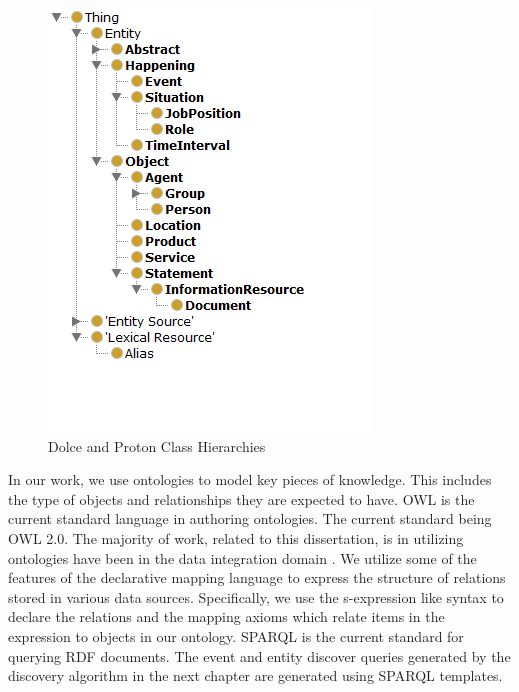 \begin{figure}[ht]
\begin{minipage}[b]{0.45\linewidth}
\includegraphics[width=\textwidth]{media/chapter3/proton-taxonomy}
\end{minipage}
\caption{Dolce and Proton Class Hierarchies}
\label{fig:ontology-hierarchies}
\end{figure}

In our work, we use ontologies to model key pieces of knowledge. This includes the type of objects and relationships they are expected to have. OWL is the current standard language in authoring ontologies. The current standard being OWL 2.0. The majority of work, related to this dissertation, is in utilizing ontologies have been in the data integration domain \cite{smith2007obo, noy2004semantic, astakhov2005data}. We utilize some of the features of the declarative mapping language \cite{dou2005ontology} to express the structure of relations stored in various data sources. Specifically, we use the s-expression like syntax to declare the relations and the mapping axioms which relate items in the expression to objects in our ontology. SPARQL \cite{prud2008sparql} is the current standard for querying RDF documents. The event and entity discover queries generated by the discovery algorithm in the next chapter are generated using SPARQL templates.

